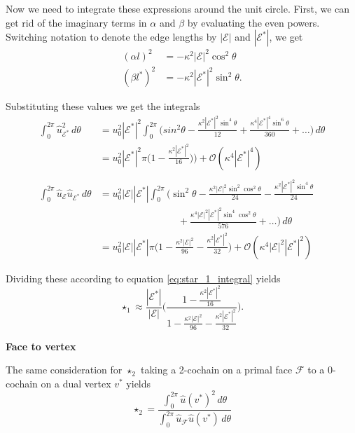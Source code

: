 \documentclass[utf8,english]{gradu3}
\begin{document}
Now we need to integrate these expressions around the unit circle.
First, we can get rid of the imaginary terms in $\alpha$ and $\beta$
by evaluating the even powers.
Switching notation to denote the edge lengths
by $|\mathcal{E}|$ and $|\mathcal{E}^*|$, we get
\begin{align*}
  (\alpha l)^2 &= -\kappa^2 |\mathcal{E}|^2 \cos^2 \theta \\
  (\beta l^*)^2 &= -\kappa^2 |\mathcal{E}^*|^2 \sin^2 \theta.
\end{align*}

Substituting these values we get the integrals
\begin{align*}
\int_{0}^{2\pi} \hat{u}_{\mathcal{E}^*}^2 \,d\theta
&= u_0^2 |\mathcal{E}^*|^2 \int_{0}^{2\pi}
\Big( sin^2\theta - \frac{\kappa^2 |\mathcal{E}^*|^2 \sin^4\theta}{12}
+ \frac{\kappa^4 |\mathcal{E}^*|^4 \sin^6\theta}{360} + \dots \Big) \,d\theta \\
&= u_0^2 |\mathcal{E}^*|^2 \pi \Big(
1 - \frac{\kappa^2 |\mathcal{E}^*|^2}{16}) \Big)
+ \mathcal{O}(\kappa^4 |\mathcal{E}^*|^4)\\
\\
\int_{0}^{2\pi} \hat{u}_{\mathcal{E}} \hat{u}_{\mathcal{E}^*} \,d\theta
&= u_0^2 |\mathcal{E}| |\mathcal{E}^*| \int_{0}^{2\pi}
\Big( \sin^2\theta - \frac{\kappa^2 |\mathcal{E}|^2 \sin^2\cos^2\theta}{24}
- \frac{\kappa^2 |\mathcal{E}^*|^2 \sin^4\theta}{24} \\
&\qquad\qquad\qquad\qquad + \frac{\kappa^4 |\mathcal{E}|^2 |\mathcal{E}^*|^2
  \sin^4\cos^2\theta}{576} + \dots \Big) \,d\theta \\
&= u_0^2 |\mathcal{E}| |\mathcal{E}^*| \pi \Big(
1 - \frac{\kappa^2 |\mathcal{E}|^2}{96} - \frac{\kappa^2 |\mathcal{E}^*|^2}{32} \Big)
+ \mathcal{O}(\kappa^4 |\mathcal{E}|^2 |\mathcal{E}^*|^2)
\end{align*}

Dividing these according to equation \eqref{eq:star_1_integral} yields
\begin{equation}\label{eq:harmonic_hodge_1}
  \star_1 \approx \frac{|\mathcal{E}^*|}{|\mathcal{E}|}
  \Big( \frac{1 - \frac{\kappa^2 |\mathcal{E}^*|^2}{16}}
  { 1 - \frac{\kappa^2 |\mathcal{E}|^2}{96} - \frac{\kappa^2 |\mathcal{E}^*|^2}{32} } \Big).
\end{equation}

\textbf{Face to vertex}

The same consideration for $\star_2$ taking a 2-cochain
on a primal face $\mathcal{F}$ to a 0-cochain 
on a dual vertex $v^*$ yields
\begin{equation}\label{eq:star_2_integral}
  \star_2 = \frac{\int_0^{2\pi} \hat{u}(v^*)^2 \,d\theta}
  {\int_0^{2\pi} \hat{u}_{\mathcal{F}} \hat{u}(v^*) \,d\theta}
\end{equation}
\end{document}
